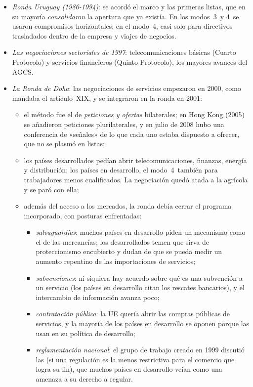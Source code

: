 \documentclass[11pt]{article}
\begin{document}
\begin{itemize}
\item \emph{Ronda Uruguay (1986-1994)}: se acordó el marco y las primeras listas, que en su mayoría \emph{consolidaron} la apertura que ya existía. En los modos~3~y 4~se usaron compromisos horizontales; en el modo~4, casi solo para directivos trasladados dentro de la empresa y viajes de negocios.
\item \emph{Las negociaciones sectoriales de 1997}: telecomunicaciones básicas (Cuarto Protocolo) y servicios financieros (Quinto Protocolo), los mayores avances del AGCS.
\item \emph{La Ronda de Doha}: las negociaciones de servicios empezaron en 2000, como mandaba el artículo~XIX, y se integraron en la ronda en 2001:
  \begin{itemize}
  \item el método fue el de \emph{peticiones y ofertas} bilaterales; en Hong Kong (2005) se añadieron peticiones plurilaterales, y en julio de 2008 hubo una conferencia de «señales» de lo que cada uno estaba dispuesto a ofrecer, que no se plasmó en listas;
  \item los países desarrollados pedían abrir telecomunicaciones, finanzas, energía y distribución; los países en desarrollo, el modo~4~también para trabajadores menos cualificados. La negociación quedó atada a la agrícola y se paró con ella;
  \item además del acceso a los mercados, la ronda debía cerrar el programa incorporado, con posturas enfrentadas:
    \begin{itemize}
    \item \emph{salvaguardias}: muchos países en desarrollo piden un mecanismo como el de las mercancías; los desarrollados temen que sirva de proteccionismo encubierto y dudan de que se pueda medir un aumento repentino de las importaciones de servicios;
    \item \emph{subvenciones}: ni siquiera hay acuerdo sobre qué es una subvención a un servicio (los países en desarrollo citan los rescates bancarios), y el intercambio de información avanza poco;
    \item \emph{contratación pública}: la UE quería abrir las compras públicas de servicios, y la mayoría de los países en desarrollo se oponen porque las usan en su política de desarrollo;
    \item \emph{reglamentación nacional}: el grupo de trabajo creado en 1999 discutió las  (si una regulación es la menos restrictiva para el comercio que logra su fin), que muchos países en desarrollo veían como una amenaza a su derecho a regular.

\end{itemize}
\end{itemize}
\end{itemize}
\end{document}
